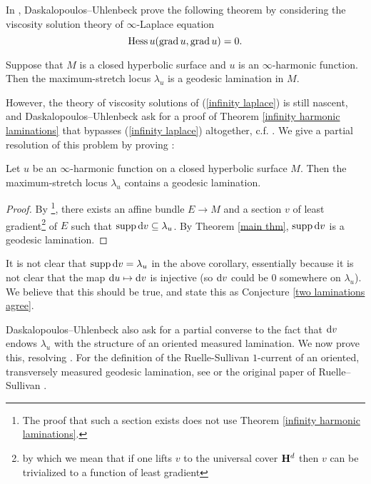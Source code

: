 In \cite[\S5]{daskalopoulos2020transverse}, Daskalopoulos--Uhlenbeck prove the following theorem by considering the viscosity solution theory of $\infty$-Laplace equation
\begin{equation}\label{infinity laplace}
    \operatorname{Hess} u(\operatorname{grad} u, \operatorname{grad} u) = 0.
\end{equation}

\begin{theorem}\label{infinity harmonic laminations}
Suppose that $M$ is a closed hyperbolic surface and $u$ is an $\infty$-harmonic function. Then the maximum-stretch locus $\lambda_u$ is a geodesic lamination in $M$.
\end{theorem}

However, the theory of viscosity solutions of (\ref{infinity laplace}) is still nascent, and Daskalopoulos--Uhlenbeck ask for a proof of Theorem \ref{infinity harmonic laminations} that bypasses (\ref{infinity laplace}) altogether, c.f. \cite[Problem 9.5]{daskalopoulos2020transverse}.
We give a partial resolution of this problem by proving \cite[Theorem-Conjecture 9.6]{daskalopoulos2020transverse}:

\begin{corollary}\label{maximum stretch contains lamination}
Let $u$ be an $\infty$-harmonic function on a closed hyperbolic surface $M$.
Then the maximum-stretch locus $\lambda_u$ contains a geodesic lamination.
\end{corollary}
\begin{proof}
By \cite[\S6]{daskalopoulos2020transverse}\footnote{The proof that such a section exists does not use Theorem \ref{infinity harmonic laminations}.}, there exists an affine bundle $E \to M$ and a section $v$ of least gradient\footnote{by which we mean that if one lifts $v$ to the universal cover $\mathbf H^d$ then $v$ can be trivialized to a function of least gradient} of $E$ such that $\operatorname{supp} \mathop{}\!\mathrm{d} v \subseteq \lambda_u$.
By Theorem \ref{main thm}, $\operatorname{supp} \mathop{}\!\mathrm{d} v$ is a geodesic lamination.
\end{proof}

It is not clear that $\operatorname{supp} \mathop{}\!\mathrm{d} v = \lambda_u$ in the above corollary, essentially because it is not clear that the map $\mathop{}\!\mathrm{d} u \mapsto \mathop{}\!\mathrm{d} v$ is injective (so $\mathop{}\!\mathrm{d} v$ could be $0$ somewhere on $\lambda_u$).
We believe that this should be true, and state this as Conjecture \ref{two laminations agree}.

Daskalopoulos--Uhlenbeck also ask for a partial converse to the fact that $\mathop{}\!\mathrm{d} v$ endows $\lambda_u$ with the structure of an oriented measured lamination.
We now prove this, resolving \cite[Problem 9.7]{daskalopoulos2020transverse}.
For the definition of the Ruelle-Sullivan $1$-current of an oriented, transversely measured geodesic lamination, see \cite[\S8]{daskalopoulos2020transverse} or the original paper of Ruelle--Sullivan \cite{Ruelle75}.

